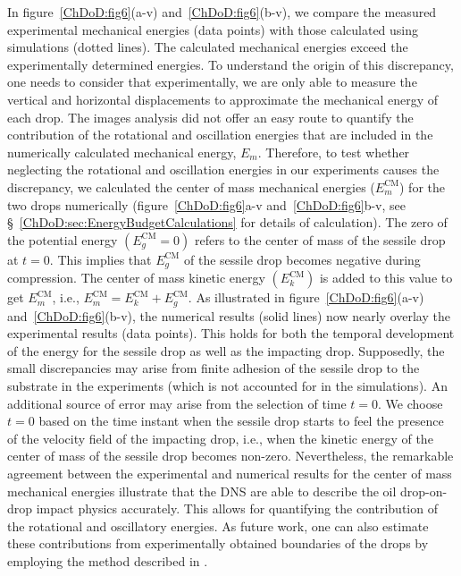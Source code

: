 In figure~\ref{ChDoD:fig6}(a-v) and~\ref{ChDoD:fig6}(b-v), we compare the measured experimental mechanical energies (data points) with those calculated using simulations (dotted lines). The calculated mechanical energies exceed the experimentally determined energies. To understand the origin of this discrepancy, one needs to consider that experimentally, we are only able to measure the vertical and horizontal displacements to approximate the mechanical energy of each drop. The images analysis did not offer an easy route to quantify the contribution of the rotational and oscillation energies that are included in the numerically calculated mechanical energy, $E_m$. Therefore, to test whether neglecting the rotational and oscillation energies in our experiments causes the discrepancy, we calculated the center of mass mechanical energies ($E_m^\text{CM}$) for the two drops numerically (figure~\ref{ChDoD:fig6}a-v and~\ref{ChDoD:fig6}b-v, see \S~\ref{ChDoD:sec:EnergyBudgetCalculations} for details of calculation). The zero of the potential energy $\left(E_g^\text{CM}=0\right)$ refers to the center of mass of the sessile drop at $t = 0$. This implies that $E_g^\text{CM}$ of the sessile drop becomes negative during compression. The center of mass kinetic energy $\left(E_k^\text{CM}\right)$ is added to this value to get $E_m^\text{CM}$, i.e., $E_m^\text{CM} = E_k^\text{CM} + E_g^\text{CM}$. As illustrated in figure~\ref{ChDoD:fig6}(a-v) and~\ref{ChDoD:fig6}(b-v), the numerical results (solid lines) now nearly overlay the experimental results (data points). This holds for both the temporal development of the energy for the sessile drop as well as the impacting drop. Supposedly, the small discrepancies may arise from finite adhesion of the sessile drop to the substrate in the experiments (which is not accounted for in the simulations). An additional source of error may arise from the selection of time $t = 0$. We choose $t = 0$ based on the time instant when the sessile drop starts to feel the presence of the velocity field of the impacting drop, i.e., when the kinetic energy of the center of mass of the sessile drop becomes non-zero. Nevertheless, the remarkable agreement between the experimental and numerical results for the center of mass mechanical energies illustrate that the DNS are able to describe the oil drop-on-drop impact physics accurately. This allows for quantifying the contribution of the rotational and oscillatory energies. As future work, one can also estimate these contributions from experimentally obtained boundaries of the drops by employing the method described in \citet{molavcek2012quasi}.

